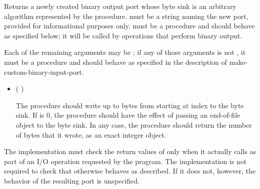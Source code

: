 \begin{entry}{%
}

Returns a newly created binary output port whose byte sink is
an arbitrary algorithm represented by the  procedure.
 must be a string naming the new port,
provided for informational purposes only.
 must be a procedure and should behave as specified
below; it will be called by operations that perform binary output.

Each of the remaining arguments may be \schfalse{}; if any of
those arguments is not \schfalse{}, it must be a procedure and
should behave as specified in the description of
{\cf make-custom-binary-input-port}.
   
\begin{itemize}
\item {\cf (   )}
       
  The  procedure should write up to  bytes
  from  starting at index  
  to the byte sink.
  If  is 0, the  procedure should
  have the effect of passing an end-of-file object to the byte sink.
  In any case, the  procedure should return the number of
  bytes that it wrote, as an exact integer object.
\end{itemize}

\implresp The implementation must check the return
values of  only when it actually calls  as part of
an I/O operation requested by the program.  The implementation is not
required to check that  otherwise behaves as described.
If it does not, however, the behavior of the resulting port is
unspecified.
\end{entry}

